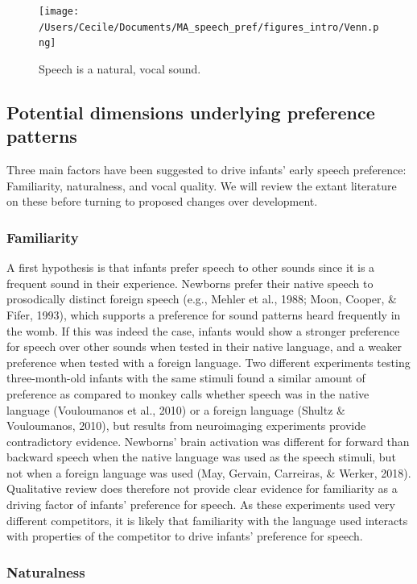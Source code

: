 \documentclass[man]{apa6}
\begin{document}
\begin{figure}
\centering
\texttt{[image: /Users/Cecile/Documents/MA\_speech\_pref/figures\_intro/Venn.png]}
\caption{\label{fig:venn}Speech is a natural, vocal sound.}
\end{figure}

\subsection{Potential dimensions underlying preference
patterns}\label{potential-dimensions-underlying-preference-patterns}

Three main factors have been suggested to drive infants' early speech
preference: Familiarity, naturalness, and vocal quality. We will review
the extant literature on these before turning to proposed changes over
development.

\subsubsection{Familiarity}\label{familiarity}

A first hypothesis is that infants prefer speech to other sounds since
it is a frequent sound in their experience. Newborns prefer their native
speech to prosodically distinct foreign speech (e.g., Mehler et al.,
1988; Moon, Cooper, \& Fifer, 1993), which supports a preference for
sound patterns heard frequently in the womb. If this was indeed the
case, infants would show a stronger preference for speech over other
sounds when tested in their native language, and a weaker preference
when tested with a foreign language. Two different experiments testing
three-month-old infants with the same stimuli found a similar amount of
preference as compared to monkey calls whether speech was in the native
language (Vouloumanos et al., 2010) or a foreign language (Shultz \&
Vouloumanos, 2010), but results from neuroimaging experiments provide
contradictory evidence. Newborns' brain activation was different for
forward than backward speech when the native language was used as the
speech stimuli, but not when a foreign language was used (May, Gervain,
Carreiras, \& Werker, 2018). Qualitative review does therefore not
provide clear evidence for familiarity as a driving factor of infants'
preference for speech. As these experiments used very different
competitors, it is likely that familiarity with the language used
interacts with properties of the competitor to drive infants' preference
for speech.

\subsubsection{Naturalness}\label{naturalness}
\end{document}
